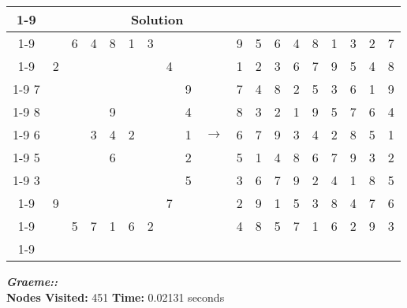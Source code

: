 \documentclass{article}
\begin{document}
\begin{tabular}{||c|c|c||c|c|c||c|c|c|| c ||c|c|c||c|c|c||c|c|c||}
  \cmidrule{1-9} \cmidrule{11-19}
  \multicolumn{9}{|c|}{Problem} &                   & \multicolumn{9}{|c|}{Solution}   \\\cmidrule{1-9} \cmidrule{11-19} \morecmidrules \cmidrule{1-9} \cmidrule{11-19}
  &   & 6 & 4 & 8 & 1 & 3 &   &   &  & 9 & 5 & 6 & 4 & 8 & 1 & 3 & 2 & 7\\\cmidrule{1-9} \cmidrule{11-19}
  & 2 &   &   &   &   &   & 4 &   &  & 1 & 2 & 3 & 6 & 7 & 9 & 5 & 4 & 8\\\cmidrule{1-9} \cmidrule{11-19}
7 &   &   &   &   &   &   &   & 9 &  & 7 & 4 & 8 & 2 & 5 & 3 & 6 & 1 & 9\\\cmidrule{1-9} \cmidrule{11-19} \morecmidrules \cmidrule{1-9} \cmidrule{11-19}
8 &   &   &   & 9 &   &   &   & 4 &  & 8 & 3 & 2 & 1 & 9 & 5 & 7 & 6 & 4\\\cmidrule{1-9} \cmidrule{11-19}
6 &   &   & 3 & 4 & 2 &   &   & 1 & $\rightarrow$ & 6 & 7 & 9 & 3 & 4 & 2 & 8 & 5 & 1\\\cmidrule{1-9} \cmidrule{11-19}
5 &   &   &   & 6 &   &   &   & 2 &  & 5 & 1 & 4 & 8 & 6 & 7 & 9 & 3 & 2\\\cmidrule{1-9} \cmidrule{11-19} \morecmidrules \cmidrule{1-9} \cmidrule{11-19}
3 &   &   &   &   &   &   &   & 5 &  & 3 & 6 & 7 & 9 & 2 & 4 & 1 & 8 & 5\\\cmidrule{1-9} \cmidrule{11-19}
  & 9 &   &   &   &   &   & 7 &   &  & 2 & 9 & 1 & 5 & 3 & 8 & 4 & 7 & 6\\\cmidrule{1-9} \cmidrule{11-19}
  &   & 5 & 7 & 1 & 6 & 2 &   &   &  & 4 & 8 & 5 & 7 & 1 & 6 & 2 & 9 & 3\\\cmidrule{1-9} \cmidrule{11-19} \morecmidrules \cmidrule{1-9} \cmidrule{11-19}
\end{tabular}
\newpage
\small\emph{\textbf{Graeme::}}\\ \textbf{Nodes Visited:} 451 \textbf{Time:} 0.02131 seconds\\
\end{document}

